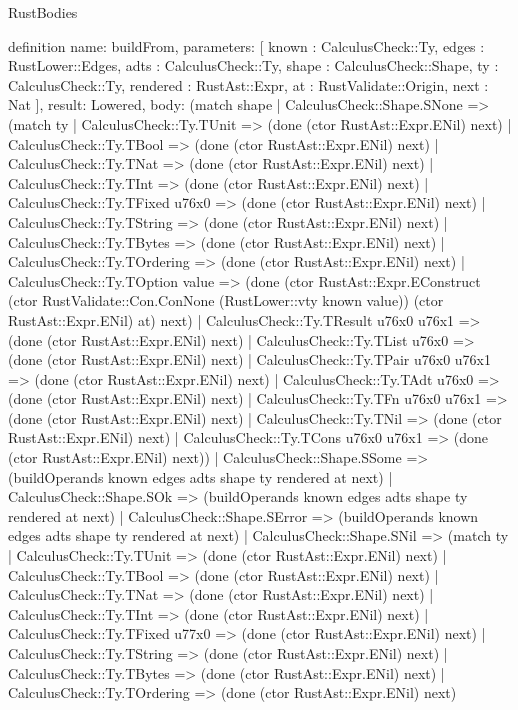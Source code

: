 \begin{lexlean}{RustBodies}
\begin{semanticmodule}
definition{
  name: buildFrom,
  parameters: [
    known : CalculusCheck::Ty,
    edges : RustLower::Edges,
    adts : CalculusCheck::Ty,
    shape : CalculusCheck::Shape,
    ty : CalculusCheck::Ty,
    rendered : RustAst::Expr,
    at : RustValidate::Origin,
    next : Nat
  ],
  result: Lowered,
  body: (match shape
    | CalculusCheck::Shape.SNone => (match ty
      | CalculusCheck::Ty.TUnit => (done (ctor RustAst::Expr.ENil) next)
      | CalculusCheck::Ty.TBool => (done (ctor RustAst::Expr.ENil) next)
      | CalculusCheck::Ty.TNat => (done (ctor RustAst::Expr.ENil) next)
      | CalculusCheck::Ty.TInt => (done (ctor RustAst::Expr.ENil) next)
      | CalculusCheck::Ty.TFixed u76x0 => (done (ctor RustAst::Expr.ENil) next)
      | CalculusCheck::Ty.TString => (done (ctor RustAst::Expr.ENil) next)
      | CalculusCheck::Ty.TBytes => (done (ctor RustAst::Expr.ENil) next)
      | CalculusCheck::Ty.TOrdering => (done (ctor RustAst::Expr.ENil) next)
      | CalculusCheck::Ty.TOption value => (done (ctor RustAst::Expr.EConstruct (ctor RustValidate::Con.ConNone (RustLower::vty known value)) (ctor RustAst::Expr.ENil) at) next)
      | CalculusCheck::Ty.TResult u76x0 u76x1 => (done (ctor RustAst::Expr.ENil) next)
      | CalculusCheck::Ty.TList u76x0 => (done (ctor RustAst::Expr.ENil) next)
      | CalculusCheck::Ty.TPair u76x0 u76x1 => (done (ctor RustAst::Expr.ENil) next)
      | CalculusCheck::Ty.TAdt u76x0 => (done (ctor RustAst::Expr.ENil) next)
      | CalculusCheck::Ty.TFn u76x0 u76x1 => (done (ctor RustAst::Expr.ENil) next)
      | CalculusCheck::Ty.TNil => (done (ctor RustAst::Expr.ENil) next)
      | CalculusCheck::Ty.TCons u76x0 u76x1 => (done (ctor RustAst::Expr.ENil) next))
    | CalculusCheck::Shape.SSome => (buildOperands known edges adts shape ty rendered at next)
    | CalculusCheck::Shape.SOk => (buildOperands known edges adts shape ty rendered at next)
    | CalculusCheck::Shape.SError => (buildOperands known edges adts shape ty rendered at next)
    | CalculusCheck::Shape.SNil => (match ty
      | CalculusCheck::Ty.TUnit => (done (ctor RustAst::Expr.ENil) next)
      | CalculusCheck::Ty.TBool => (done (ctor RustAst::Expr.ENil) next)
      | CalculusCheck::Ty.TNat => (done (ctor RustAst::Expr.ENil) next)
      | CalculusCheck::Ty.TInt => (done (ctor RustAst::Expr.ENil) next)
      | CalculusCheck::Ty.TFixed u77x0 => (done (ctor RustAst::Expr.ENil) next)
      | CalculusCheck::Ty.TString => (done (ctor RustAst::Expr.ENil) next)
      | CalculusCheck::Ty.TBytes => (done (ctor RustAst::Expr.ENil) next)
      | CalculusCheck::Ty.TOrdering => (done (ctor RustAst::Expr.ENil) next)
}
\end{semanticmodule}
\end{lexlean}
